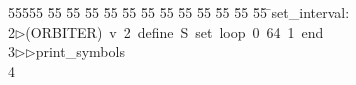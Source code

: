 %
%
\begin{tabbing}
55555 \= 55 \= 55 \= 55 \= 55 \= 55 \= 55 \= 55 \= 55 \= 55 \= 55 \= 55 \= 55 \= \>set\_interval:\\[0pt]
2\>$\triangleright$\>(ORBITER)\ v\ 2\ define\ S\ set\ loop\ 0\ 64\ 1\ end\ \\[0pt]
3\>$\triangleright$\>$\triangleright$\>print\_symbols\\[0pt]
4\>\end{tabbing}
